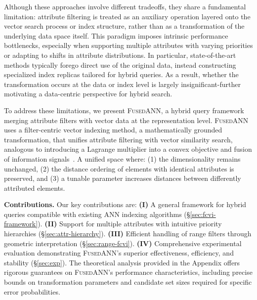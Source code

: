\documentclass[numbers,sort]{article}
\begin{document}
Although these approaches involve different tradeoffs, they share a fundamental limitation: attribute filtering is treated as an auxiliary operation layered onto the vector search process or index structure, rather than as a transformation of the underlying data space itself. This paradigm imposes intrinsic performance bottlenecks, especially when supporting multiple attributes with varying priorities or adapting to shifts in attribute distributions. In particular, state-of-the-art methods typically forego direct use of the original data, instead constructing specialized index replicas tailored for hybrid queries. As a result, whether the transformation occurs at the data or index level is largely insignificant-further motivating a data-centric perspective for hybrid search.

To address these limitations, we present \textsc{FusedANN}, a hybrid query framework merging attribute filters with vector data at the representation level. \textsc{FusedANN} uses a filter-centric vector indexing method, a mathematically grounded transformation, that unifies attribute filtering with vector similarity search, analogous to introducing a Lagrange multiplier into a convex objective and fusion of information signals~\cite{boyd2004convex,heidari2024record,heidari2020record,heidari2019holodetect}. A unified space where: (1) the dimensionality remains unchanged, (2) the distance ordering of elements with identical attributes is preserved, and (3) a tunable parameter increases distances between differently attributed elements.

\textbf{Contributions.} Our key contributions are: \textbf{(I)} A general framework for hybrid queries compatible with existing ANN indexing algorithms (\hyperref[sec:fcvi-framework]{\S\ref*{sec:fcvi-framework}}). \textbf{(II)} Support for multiple attributes with intuitive priority hierarchies (\hyperref[sec:attr-hierarchy]{\S\ref*{sec:attr-hierarchy}}). \textbf{(III)} Efficient handling of range filters through geometric interpretation (\hyperref[sec:range-fcvi]{\S\ref*{sec:range-fcvi}}). \textbf{(IV)} Comprehensive experimental evaluation demonstrating \textsc{FusedANN}'s superior effectiveness, efficiency, and stability (\hyperref[sec:exp]{\S\ref*{sec:exp}}). The theoretical analysis provided in the Appendix offers rigorous guarantees on \textsc{FusedANN}'s performance characteristics, including precise bounds on transformation parameters and candidate set sizes required for specific error probabilities.
\end{document}
